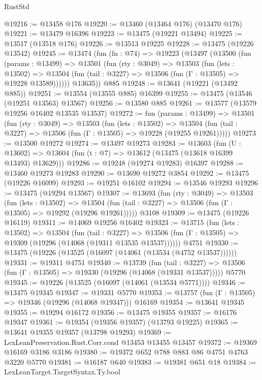 \begin{lexlean}{RustStd}
\begin{coremodule}
@19216 := @13458 @176
@19220 := @13460 (@13464 @176) (@13470 @176)
@19221 := @13479 @16396
@19223 := @13475 (@19221 @13494)
@19225 := @13517 (@13518 @176)
@19226 := @13513 @19225
@19228 := @13475 (@19226 @13542)
@19245 := @13474
    (fun (fn : @74) =>
    @19223
      (@13497
        (@13500
          (fun (params : @13499) =>
          @13501
            (fun (rty : @3049) =>
            @13503
              (fun (lets : @13502) =>
              @13504 (fun (tail : @3227) => @13506 (fun (Γ : @13505) => @19228 @13589))))))
        @13635))
    @885
@19248 := @13641 (@19221 (@13492 @885))
@19251 := @13554 (@13555 @885) @16399
@19255 := @13475 (@13546 (@19251 @13563) @13567)
@19256 := @13580 @885
@19261 := @13577 (@13579 @19256 @16402 @13535 @13537)
@19272 := fun (params : @13499) =>
  @13501
    (fun (rty : @3049) =>
    @13503
      (fun (lets : @13502) =>
      @13504 (fun (tail : @3227) => @13506 (fun (Γ : @13505) => @19228 (@19255 @19261)))))
@19273 := @13500 @19272
@19274 := @13497 @19273
@19283 := @13603
    (fun (U : @13602) => @13604 (fun (t : @7) => @13612 (@13475 (@13618 @16399 @13493) @13629)))
@19286 := @19248 (@19274 @19283) @16397
@19288 := @13460 @19273 @19283
@19290 := @13690 @19272 @3854
@19292 := @13475 (@19226 @16099)
@19293 := @19251 @16102
@19294 := @13546 @19293
@19296 := @13475 (@19294 @13567)
@19307 := @13693
    (fun (rty : @3049) =>
    @13503
      (fun (lets : @13502) =>
      @13504 (fun (tail : @3227) => @13506 (fun (Γ : @13505) => @19292 (@19296 @19261)))))
    @3108
@19309 := @13475 (@19226 @16119)
@19311 := @14069 @19256 @16402
@19323 := @13715
    (fun (lets : @13502) =>
    @13504
      (fun (tail : @3227) =>
      @13506 (fun (Γ : @13505) => @19309 (@19296 (@14068 (@19311 @13535 @13537))))))
    @4751
@19330 := @13475 (@19226 (@13525 (@16097 (@14061 (@13534 (@4752 @13537))))))
@19331 := @19311 @4751
@19340 := @13739
    (fun (tail : @3227) => @13506 (fun (Γ : @13505) => @19330 (@19296 (@14068 (@19331 @13537)))))
    @5770
@19345 := @19226 (@13525 (@16097 (@14061 (@13534 @5771))))
@19346 := @13475 @19345
@19347 := @19331 @5770
@19353 := @13757 (fun (Γ : @13505) => @19346 (@19296 (@14068 @19347))) @16169
@19354 := @13641 @19345
@19355 := @19294 @16172
@19356 := @13475 @19355
@19357 := @16176 @19347
@19361 := @19354 (@19356 @19357) (@13793 @19225)
@19365 := @13641 @19355 @19357 (@13798 @19293)
@19369 := LexLeanPreservation.Rust.Corr.cond @13453 @13455 @13457
@19372 := @19369 @16169 @3186 @3186
@19380 := @19372 @652 @788 @883 @86 @4751 @4763 @3220 @5770
@19381 := @16187 @640
@19383 := @19381 @651 @18
@19384 := LexLeanTarget.TargetSyntax.Ty.bool

\end{coremodule}
\end{lexlean}
